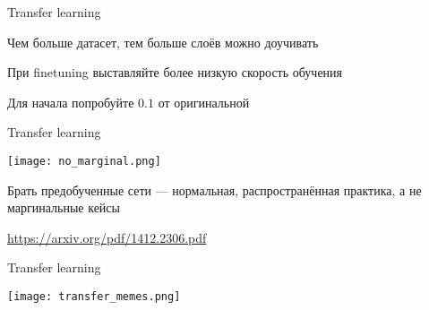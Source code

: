 \documentclass[notes,12pt, aspectratio=169]{beamer}
\newenvironment{wideitemize}{\itemize\addtolength{\itemsep}{10pt}}{\enditemize}
\begin{document}
\begin{frame}{Transfer learning}
	\begin{wideitemize}
		\item Чем больше датасет, тем больше слоёв можно доучивать
		\item При finetuning выставляйте более низкую скорость обучения
		\item Для начала попробуйте $0.1$ от оригинальной 
	\end{wideitemize}
\end{frame}


\begin{frame}{Transfer learning}
\begin{center}
	\texttt{[image: no\_marginal.png]}
	
\alert{Брать предобученные сети — нормальная, распространённая практика, а не маргинальные кейсы}
\end{center}
\vfill %
\footnotesize
{\color{blue}  \url{https://arxiv.org/pdf/1412.2306.pdf}}
\end{frame}


\begin{frame}{Transfer learning}
\begin{center}
	\texttt{[image: transfer\_memes.png]}
\end{center}
\end{frame}


\end{document}
